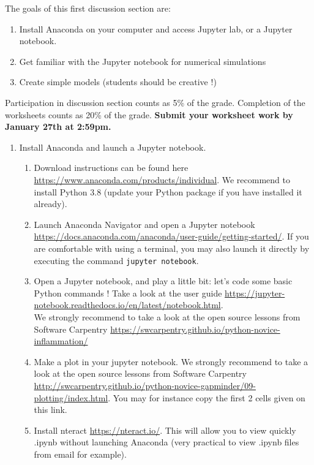 \documentclass[11pt]{article}
\begin{document}
The goals of this first discussion section are: 

\begin{enumerate}
\item Install Anaconda on your computer and access Jupyter lab, or a Jupyter notebook.
\item Get familiar with the Jupyter notebook for numerical simulations 
\item Create simple models (students should be creative !)
\end{enumerate}

Participation in discussion section counts as 5\% of the grade. Completion of the worksheets counts as 20\% of the grade. \textbf{Submit your worksheet work by January 27th at 2:59pm.}
\begin{enumerate}
\item Install Anaconda and launch a Jupyter notebook.
\begin{enumerate}
\item Download instructions can be found here \url{https://www.anaconda.com/products/individual}. We recommend to install Python 3.8 (update your Python package if you have installed it already).
\item Launch Anaconda Navigator and open a Jupyter notebook \url{https://docs.anaconda.com/anaconda/user-guide/getting-started/}. If you are comfortable with using a terminal, you may also launch it directly by executing the command \texttt{jupyter notebook}.
\item Open a Jupyter notebook, and play a little bit: let's code some basic Python commands ! Take a look at the user guide \url{https://jupyter-notebook.readthedocs.io/en/latest/notebook.html}. \\
We strongly recommend to take a look at the open source lessons from Software Carpentry \url{https://swcarpentry.github.io/python-novice-inflammation/}
\item Make a plot in your jupyter notebook. We strongly recommend to take a look at the open source lessons from Software Carpentry \url{http://swcarpentry.github.io/python-novice-gapminder/09-plotting/index.html}. You may for instance copy the first 2 cells given on this link.
\item Install nteract \url{https://nteract.io/}. This will allow you to view quickly .ipynb without launching Anaconda (very practical to view .ipynb files from email for example).
\end{enumerate}


\end{enumerate}
\end{document}
